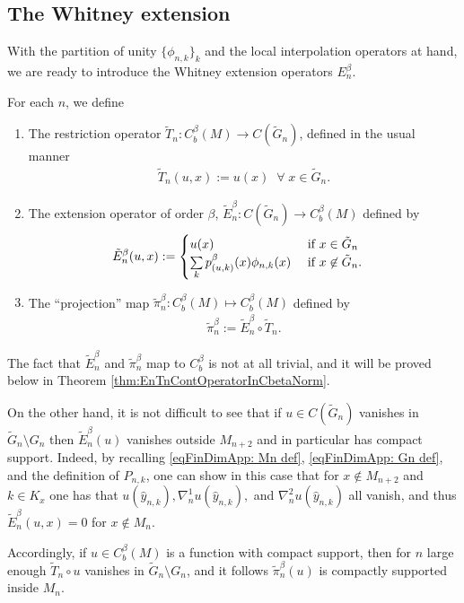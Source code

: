 \documentclass[11pt,reqno]{amsart}
\numberwithin{equation}{section}
\theoremstyle{plain}
\begin{document}
  \subsection{The Whitney extension} With the partition of unity $\{\phi_{n,k}\}_k$ and the local interpolation operators at hand, we are ready to introduce the Whitney extension operators $E^{\beta}_n$.
  \begin{DEF}\label{def:WhitneyExt}
  For each $n$, we define
  \begin{enumerate}
    \item The restriction operator $\tilde T_n: C_b^{\beta}(M)\to C(\tilde G_n)$, defined in the usual manner
    \begin{align*}
      \tilde T_n(u,x) := u(x)\;\;\forall\;x\in \tilde G_n.
    \end{align*}
    \item The extension operator of order $\beta$, $\tilde E_n^{\beta}: C(\tilde G_n) \to C^{\beta}_b(M)$ defined by
    \begin{align*}
      \tilde E_n^{\beta}(u,x) & := \begin{cases} 
	u(x) & \textnormal{ if } x \in \tilde G_n\\
	\sum \limits_{k} p^\beta_{(u,k)}(x)\phi_{n,k}(x) & \textnormal{ if } x\not\in \tilde G_n.
      \end{cases}	
    \end{align*}	  
    \item The ``projection'' map $\tilde \pi_n^{\beta} : C^{\beta}_b(M) \mapsto C^{\beta}_b(M)$ defined by
    \begin{align*}
      \tilde \pi_n^{\beta} := \tilde E_n^{\beta}\circ \tilde T_n.	
    \end{align*}
  \end{enumerate}	
  \end{DEF}	  


\begin{rem} The fact that $\tilde E_n^\beta$ and $\tilde \pi_n^\beta$ map to $C^\beta_b$ is not at all trivial, and it will be proved below in Theorem \ref{thm:EnTnContOperatorInCbetaNorm}.
\end{rem}

\begin{rem}\label{rem:extension preserves compact support}
On the other hand, it is not difficult to see that if $u \in C(\tilde G_n)$ vanishes in $\tilde G_n\setminus G_n$ then $\tilde E_n^\beta(u)$ vanishes outside $M_{n+2}$ and in particular has compact support. Indeed, by recalling \eqref{eqFinDimApp: Mn def}, \eqref{eqFinDimApp: Gn def}, and the definition of $P_{n,k}$, one can show in this case that for $x\not\in M_{n+2}$ and $k\in K_x$ one has that $u(\hat y_{n,k}),\nabla^1_nu(\hat y_{n,k}),$ and $\nabla^2_nu(\hat y_{n,k})$ all vanish, and thus $\tilde E_n^\beta(u,x)=0$ for $x \not \in M_n$.

Accordingly, if $u \in C^{\beta}_b(M)$ is a function with compact support, then for $n$ large enough $\tilde T_n\circ u$ vanishes in $\tilde G_n \setminus G_n$,  and it follows $\tilde \pi_n^\beta(u)$ is compactly supported inside $M_n$.

\end{rem}
  
\end{document}
